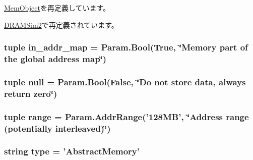 \hyperlink{classMemObject_1_1MemObject_a17da7064bc5c518791f0c891eff05fda}{MemObject}を再定義しています。

\hyperlink{classDRAMSim2_1_1DRAMSim2_a17da7064bc5c518791f0c891eff05fda}{DRAMSim2}で再定義されています。\hypertarget{classAbstractMemory_1_1AbstractMemory_a19b298706aab3f429aaf3d3e719613b3}{
\subsubsection[{in\_\-addr\_\-map}]{\setlength{\rightskip}{0pt plus 5cm}tuple {\bf in\_\-addr\_\-map} = Param.Bool(True, \char`\"{}Memory part of the global address map\char`\"{})}}
\label{classAbstractMemory_1_1AbstractMemory_a19b298706aab3f429aaf3d3e719613b3}
\hypertarget{classAbstractMemory_1_1AbstractMemory_ab4d728107c8135f96ef3cb8c84621e90}{
\subsubsection[{null}]{\setlength{\rightskip}{0pt plus 5cm}tuple {\bf null} = Param.Bool(False, \char`\"{}Do not store data, always return zero\char`\"{})}}
\label{classAbstractMemory_1_1AbstractMemory_ab4d728107c8135f96ef3cb8c84621e90}
\hypertarget{classAbstractMemory_1_1AbstractMemory_ae7aca7a468be02fee9f4e8d0af49932f}{
\subsubsection[{range}]{\setlength{\rightskip}{0pt plus 5cm}tuple {\bf range} = Param.AddrRange('128MB', \char`\"{}Address range (potentially interleaved)\char`\"{})}}
\label{classAbstractMemory_1_1AbstractMemory_ae7aca7a468be02fee9f4e8d0af49932f}
\hypertarget{classAbstractMemory_1_1AbstractMemory_acce15679d830831b0bbe8ebc2a60b2ca}{
\subsubsection[{type}]{\setlength{\rightskip}{0pt plus 5cm}string {\bf type} = '{\bf AbstractMemory}'}}
\label{classAbstractMemory_1_1AbstractMemory_acce15679d830831b0bbe8ebc2a60b2ca}


